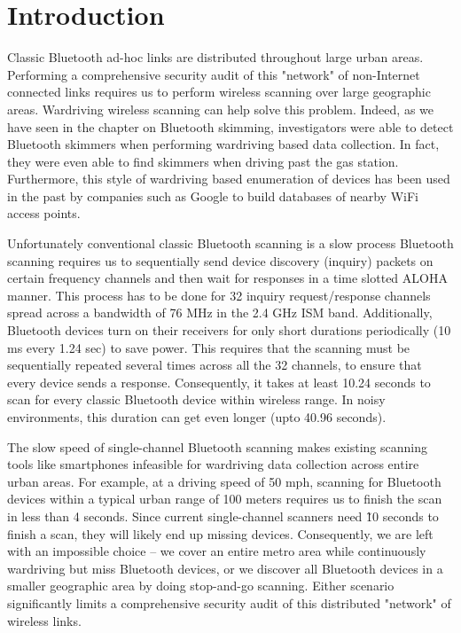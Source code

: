 \section{Introduction}
\label{sec:hyperscanner:intro}
Classic Bluetooth ad-hoc links are distributed throughout large urban areas. 
%
Performing a comprehensive security audit of this "network" of non-Internet connected links requires us to perform wireless scanning over large geographic areas.
%
Wardriving wireless scanning can help solve this problem.
%
Indeed, as we have seen in the chapter on Bluetooth skimming, investigators were able to detect Bluetooth skimmers when performing wardriving based data collection.
%
In fact, they were even able to find skimmers when driving past the gas station.
%
Furthermore, this style of wardriving based enumeration of devices has been used in the past by companies such as Google to build databases of nearby WiFi access points.

Unfortunately conventional classic Bluetooth scanning is a slow process
%
Bluetooth scanning requires us to sequentially send device discovery (inquiry) packets on certain frequency channels and then wait for responses in a time slotted ALOHA manner. 
%
This process has to be done for 32 inquiry request/response channels spread across a bandwidth of 76 MHz in the 2.4 GHz ISM band.
%
Additionally, Bluetooth devices turn on their receivers for only short durations periodically (10 ms every 1.24 sec) to save power.
%
This requires that the scanning must be sequentially repeated several times across all the 32 channels, to ensure that every device sends a response.
%
Consequently, it takes at least 10.24 seconds to scan for every classic Bluetooth device within wireless range. 
%
In noisy environments, this duration can get even longer (upto 40.96 seconds).
%

The slow speed of single-channel Bluetooth scanning makes existing scanning tools like smartphones infeasible for wardriving data collection across entire urban areas. 
%
For example, at a driving speed of 50 mph, scanning for Bluetooth devices within a typical urban range of 100 meters requires us to finish the scan in less than 4 seconds.
%
Since current single-channel scanners need \~10 seconds to finish a scan, they will likely end up missing devices.
%
Consequently, we are left with an impossible choice -- we cover an entire metro area while continuously wardriving but miss Bluetooth devices, or we discover all Bluetooth devices in a smaller geographic area by doing stop-and-go scanning.
%
Either scenario significantly limits a comprehensive security audit of this distributed "network" of wireless links.
%

